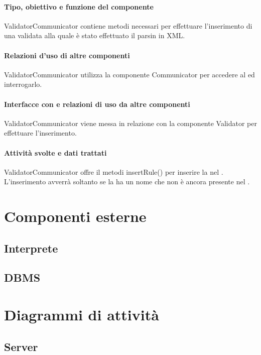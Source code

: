 \documentclass[11pt,titlepage,a4paper]{report}
\begin{document}
\subsubsection{Tipo, obiettivo e funzione del componente}
ValidatorCommunicator contiene metodi necessari per effettuare l'inserimento di una \br validata alla quale \`e stato effettuato il parsin in XML.
\subsubsection{Relazioni d'uso di altre componenti}
ValidatorCommunicator utilizza la componente Communicator per accedere al \re ed interrogarlo.
\subsubsection{Interfacce con e relazioni di uso da altre componenti}
ValidatorCommunicator viene messa in relazione con la componente Validator per effettuare l'inserimento.
\subsubsection{Attivit\`a svolte e dati trattati}
ValidatorCommunicator offre il metodi insertRule() per inserire la \br nel \re. L'inserimento avverr\`a soltanto se la \br ha un nome che non \`e ancora presente nel \re.

\chapter{Componenti esterne}
\section{Interprete}

\section{DBMS}



\chapter{Diagrammi di attivit\`a}


\section{Server}
\end{document}
